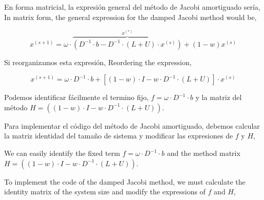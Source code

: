 \begin{paracol}{2}

En forma matricial, la expresión general del método de Jacobi amortiguado sería,
\switchcolumn
In matrix form, the general expression for the damped Jacobi method would be,
\end{paracol}
\begin{equation*}
x^{(s+1)}=\omega\cdot\overbrace{\left(D^{-1}\cdot b- D^{-1}\cdot\left(L+U\right)\cdot x^{(s)}\right)}^{x^{(*)}}+(1-w)x^{(s)}
\end{equation*}

\begin{paracol}{2}
Si reorganizamos esta expresión,
\switchcolumn
Reordering the expression,
\end{paracol}


\begin{equation*}
x^{(s+1)}=\omega\cdot D^{-1}\cdot b+ \left[(1-w)\cdot I - w\cdot  D^{-1}\cdot  \left(L+U \right)\right]\cdot x^{(s)}
\end{equation*}

\begin{paracol}{2}
Podemos identificar fácilmente el termino fijo, $f=\omega\cdot D^{-1}\cdot b$ y la matriz del método $H=\left((1-w)\cdot I - w\cdot  D^{-1}\cdot  \left(L+U \right)\right)$.

Para implementar el código del método de Jacobi amortiguado, debemos calcular la matriz identidad del tamaño de sistema y modificar las expresiones de $f$ y $H$,

\switchcolumn
We can easily identify the fixed term  $f=\omega\cdot D^{-1}\cdot b$ and the method matrix $H=\left((1-w)\cdot I - w\cdot  D^{-1}\cdot  \left(L+U \right)\right)$.

To implement the code of the damped Jacobi method, we must calculate the identity matrix of the system size and modify the expressions of $f$ and $H$,

\end{paracol}

